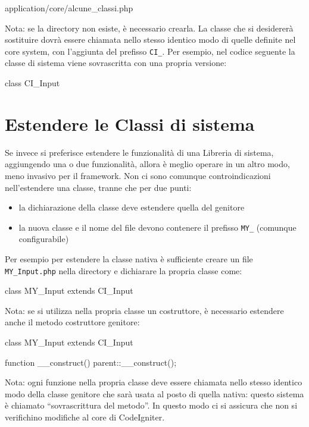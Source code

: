 \begin{code}
application/core/alcune_classi.php
\end{code}

Nota: se la directory non esiste, è necessario crearla. La classe che si desidererà sostituire dovrà essere chiamata nello stesso identico modo di quelle definite nel core system, con l'aggiunta del prefisso \verb|CI_|. Per esempio, nel codice seguente la classe di sistema  viene sovrascritta con una propria versione:

\begin{code}
class CI_Input {

}
\end{code}

\section*{Estendere le Classi di sistema}
Se invece si preferisce estendere le funzionalità di una Libreria di sistema, aggiungendo una o due funzionalità, allora è meglio operare in un altro modo, meno invasivo per il framework. Non ci sono comunque controindicazioni nell'estendere una classe, tranne che per due punti:

\begin{itemize}
\item la dichiarazione della classe deve estendere quella del genitore
\item la nuova classe e il nome del file devono contenere il prefisso \verb|MY_| (comunque configurabile)
\end{itemize}

Per esempio per estendere la classe nativa  è sufficiente creare un file \verb|MY_Input.php| nella directory  e dichiarare la propria classe come:

\begin{code}
class MY_Input extends CI_Input {

}
\end{code}

Nota: se si utilizza nella propria classe un costruttore, è necessario estendere anche il metodo costruttore genitore:

\begin{code}
class MY_Input extends CI_Input {

	function __construct() {
		parent::__construct();
    }
}
\end{code}

Nota: ogni funzione nella propria classe deve essere chiamata nello stesso identico modo della classe genitore che sarà usata al posto di quella nativa: questo sistema è chiamato ``sovrascrittura del metodo''. In questo modo ci si assicura che non si verifichino modifiche al core di CodeIgniter.

